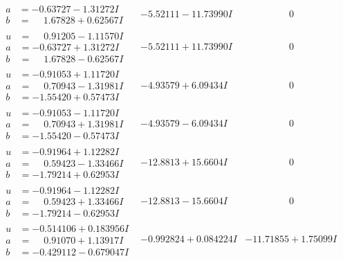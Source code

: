\documentclass[1p]{elsarticle_modified}
\theoremstyle{definition}
\begin{document}
$$\begin{array}{c|c|c}
\begin{aligned}
a &= -0.63727 - 1.31272 I \\
b &= \phantom{-}1.67828 + 0.62567 I\end{aligned}
 & -5.52111 - 11.73990 I & \phantom{-0.000000 } 0 \\ \hline\begin{aligned}
u &= \phantom{-}0.91205 - 1.11570 I \\
a &= -0.63727 + 1.31272 I \\
b &= \phantom{-}1.67828 - 0.62567 I\end{aligned}
 & -5.52111 + 11.73990 I & \phantom{-0.000000 } 0 \\ \hline\begin{aligned}
u &= -0.91053 + 1.11720 I \\
a &= \phantom{-}0.70943 - 1.31981 I \\
b &= -1.55420 + 0.57473 I\end{aligned}
 & -4.93579 + 6.09434 I & \phantom{-0.000000 } 0 \\ \hline\begin{aligned}
u &= -0.91053 - 1.11720 I \\
a &= \phantom{-}0.70943 + 1.31981 I \\
b &= -1.55420 - 0.57473 I\end{aligned}
 & -4.93579 - 6.09434 I & \phantom{-0.000000 } 0 \\ \hline\begin{aligned}
u &= -0.91964 + 1.12282 I \\
a &= \phantom{-}0.59423 - 1.33466 I \\
b &= -1.79214 + 0.62953 I\end{aligned}
 & -12.8813 + 15.6604 I & \phantom{-0.000000 } 0 \\ \hline\begin{aligned}
u &= -0.91964 - 1.12282 I \\
a &= \phantom{-}0.59423 + 1.33466 I \\
b &= -1.79214 - 0.62953 I\end{aligned}
 & -12.8813 - 15.6604 I & \phantom{-0.000000 } 0 \\ \hline\begin{aligned}
u &= -0.514106 + 0.183956 I \\
a &= \phantom{-}0.91070 + 1.13917 I \\
b &= -0.429112 - 0.679047 I\end{aligned}
 & -0.992824 + 0.084224 I & -11.71855 + 1.75099 I \\ \hline\begin{aligned}

\end{aligned}
\end{array}$$
\end{document}
